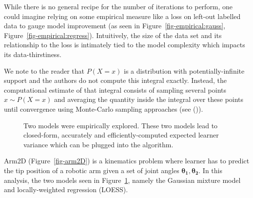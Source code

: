 \documentclass[
  letterpaper,
  numbers=noenddot,
  DIV=11]{scrreprt}
\theoremstyle{definition}
\theoremstyle{plain}
\theoremstyle{plain}
\theoremstyle{remark}
\begin{document}
While there is no general recipe for the number of iterations to
perform, one could imagine relying on some empirical measure like a loss
on left-out labelled data to gauge model improvement (as seen in
Figure~\ref{fig-empirical:gauss}, Figure~\ref{fig-empirical:regress}).
Intuitively, the size of the data set and its relationship to the loss
is intimately tied to the model complexity which impacts its
data-thirstiness.

We note to the reader that \(P(X=x)\) is a distribution with
potentially-infinite support and the authors do not compute this
integral exactly. Instead, the computational estimate of that integral
consists of sampling several points \(x \sim P(X=x)\) and averaging the
quantity inside the integral over these points until convergence using
Monte-Carlo sampling approaches (see ()).

\begin{figure}


\caption{\label{fig-two_models}Two models were empirically explored.
These two models lead to closed-form, accurately and
efficiently-computed expected learner variance which can be plugged into
the algorithm.}

\end{figure}%

Arm2D (Figure~\ref{fig-arm2D}) is a kinematics problem where learner has
to predict the tip position of a robotic arm given a set of joint angles
\(\mathbf{\theta_1}, \mathbf{\theta_2}\). In this analysis, the two
models seen in Figure~\ref{fig-two_models}, namely the Gaussian mixture
model and locally-weighted regression (LOESS).
\end{document}
